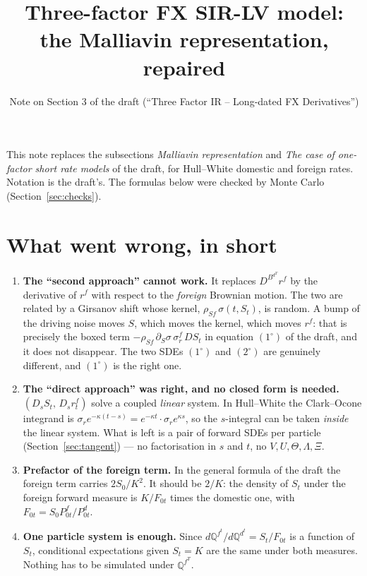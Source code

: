 \documentclass[11pt,a4paper]{article}
\title{Three-factor FX SIR-LV model:\\ the Malliavin representation, repaired}
\author{Note on Section 3 of the draft (``Three Factor IR -- Long-dated FX Derivatives'')}
\date{}
\theoremstyle{plain}
\theoremstyle{remark}
\newcommand{\Q}{\mathbb{Q}}
\begin{document}
\maketitle

\noindent
This note replaces the subsections \emph{Malliavin representation} and
\emph{The case of one-factor short rate models} of the draft, for Hull--White
domestic and foreign rates. Notation is the draft's. The formulas below were
checked by Monte Carlo (Section~\ref{sec:checks}).

\section{What went wrong, in short}

\begin{enumerate}
\item \textbf{The ``second approach'' cannot work.} It replaces
$D^{B^{d^T}}r^f$ by the derivative of $r^f$ with respect to the \emph{foreign}
Brownian motion. The two are related by a Girsanov shift whose kernel,
$\rho_{Sf}\,\sigma(t,S_t)$, is random. A bump of the driving noise moves $S$,
which moves the kernel, which moves $r^f$: that is precisely the boxed term
$-\rho_{Sf}\,\partial_S\sigma\,\sigma^f_r\,D S_t$ in equation $(1^\circ)$ of the
draft, and it does not disappear. The two SDEs $(1^\circ)$ and $(2^\circ)$ are
genuinely different, and $(1^\circ)$ is the right one.

\item \textbf{The ``direct approach'' was right, and no closed form is needed.}
$(D_sS_t,\,D_sr^f_t)$ solve a coupled \emph{linear} system. In Hull--White the
Clark--Ocone integrand is $\sigma_r e^{-\kappa (t-s)}=e^{-\kappa t}\cdot\sigma_r
e^{\kappa s}$, so the $s$-integral can be taken \emph{inside} the linear system.
What is left is a pair of forward SDEs per particle (Section~\ref{sec:tangent})
--- no factorisation in $s$ and $t$, no $V,U,\Theta,\Lambda,\Xi$.

\item \textbf{Prefactor of the foreign term.} In the general formula of the
draft the foreign term carries $2S_0/K^2$. It should be $2/K$: the density of
$S_t$ under the foreign forward measure is $K/F_{0t}$ times the domestic one,
with $F_{0t}=S_0P^f_{0t}/P^d_{0t}$.

\item \textbf{One particle system is enough.} Since
$d\Q^{f^t}/d\Q^{d^t}=S_t/F_{0t}$ is a function of $S_t$, conditional
expectations given $S_t=K$ are the same under both measures. Nothing has to be
simulated under $\Q^{f^T}$.
\end{enumerate}
\end{document}

